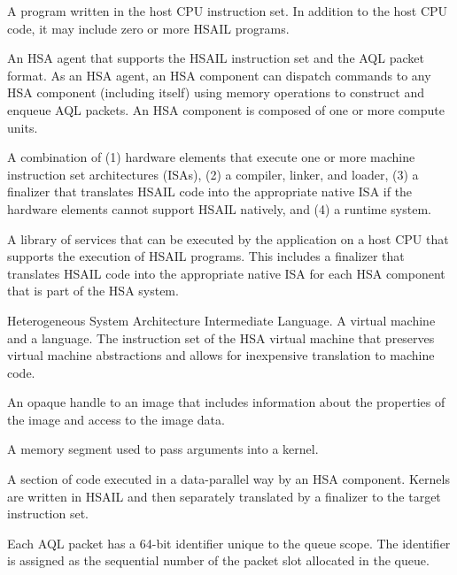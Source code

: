 \documentclass[final,oneside]{book}
\begin{document}
\begin{description}[itemsep=5pt,leftmargin=0cm, labelindent=0cm]
\item[HSA application] A program written in the host CPU instruction set. In
  addition to the host CPU code, it may include zero or more HSAIL programs.

\item[HSA component]
  An HSA agent that supports the HSAIL instruction set and the AQL packet
  format. As an HSA agent, an HSA component can dispatch commands to any HSA
  component (including itself) using memory operations to construct and enqueue
  AQL packets. An HSA component is composed of one or more compute units.

\item[HSA implementation] A combination of (1) hardware elements that execute
  one or more machine instruction set architectures (ISAs), (2) a compiler,
  linker, and loader, (3) a finalizer that translates HSAIL code into the
  appropriate native ISA if the hardware elements cannot support HSAIL
  natively, and (4) a runtime system.

\item[HSA runtime] A library of services that can be executed by the application
  on a host CPU that supports the execution of HSAIL programs. This includes a
  finalizer that translates HSAIL code into the appropriate native ISA for each
  HSA component that is part of the HSA system.

\item[HSAIL] Heterogeneous System Architecture Intermediate Language. A virtual
  machine and a language. The instruction set of the HSA virtual machine that
  preserves virtual machine abstractions and allows for inexpensive translation
  to machine code.

\item[Image handle] An opaque handle to an image that includes information about
  the properties of the image and access to the image data.

\item[Kernarg segment] A memory segment used to pass arguments into a kernel.

\item[Kernel] A section of code executed in a data-parallel way by an HSA
  component. Kernels are written in HSAIL and then separately translated by a
  finalizer to the target instruction set.

\item[Packet ID] Each AQL packet has a 64-bit identifier unique to the queue
  scope. The identifier is assigned as the sequential number of the packet slot
  allocated in the queue.


\end{description}
\end{document}
